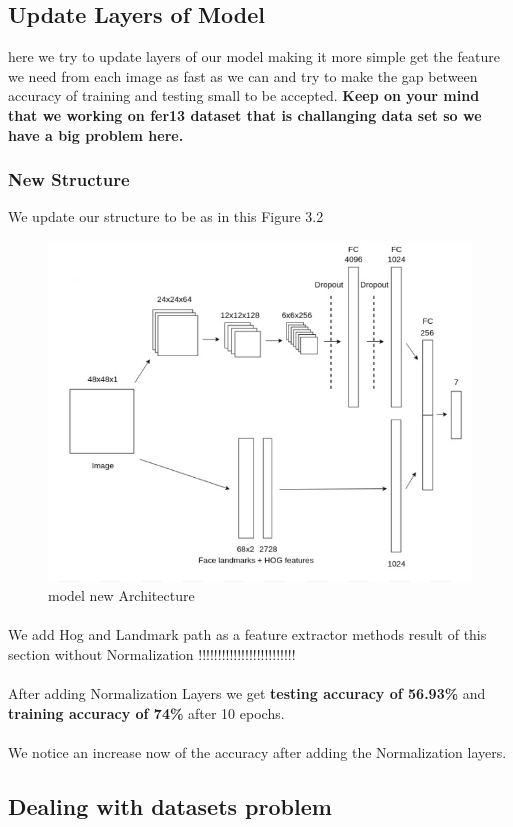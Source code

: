 \subsection{Update Layers of Model}
here we try to update layers of our model making it more simple get the feature we need from each image as fast as we can and try to make the gap between accuracy of training and testing small to be accepted.
\textbf{Keep on your mind that we working on fer13 dataset that is challanging data set so we have a big problem here.}
\subsubsection{New Structure}
We update our structure to be as in this Figure 3.2
\begin{figure}
	\centering
	\includegraphics[width=.5\textwidth]{Arch.png}
	\caption{model new Architecture}
\end{figure} 
\paragraph{}
We add Hog and Landmark path as a feature extractor methods 
result of this section without Normalization
!!!!!!!!!!!!!!!!!!!!!!!!!
\paragraph{}
After adding Normalization Layers we get \textbf{testing accuracy of 56.93\%} and \textbf{training accuracy of 74\%} after 10 epochs. 
\paragraph{}
We notice an increase now of the accuracy after adding the Normalization layers.

\subsection{Dealing with datasets problem}
